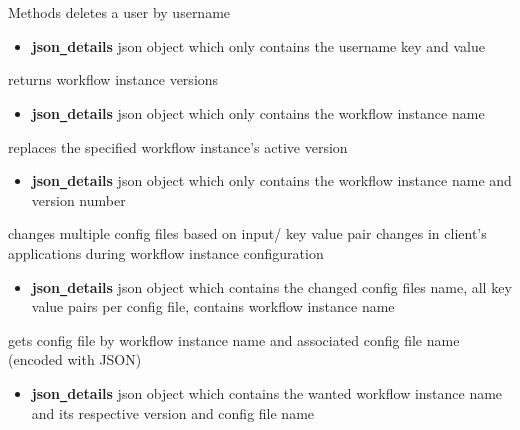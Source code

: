 \begin{methodenv}{Methods}
deletes a user by username
\begin{itemize}
        \item \textbf{json\texttt{\_}details}
        json object which only contains the username key and value
\end{itemize}

returns workflow instance versions
\begin{itemize}
        \item \textbf{json\texttt{\_}details}
        json object which only contains the workflow instance name
\end{itemize}


replaces the specified workflow instance's active version
\begin{itemize}
        \item \textbf{json\texttt{\_}details}
        json object which only contains the workflow instance name and version number
\end{itemize}


changes multiple config files based on input/ key value pair changes in client's applications during workflow instance 
configuration
\begin{itemize}
        \item \textbf{json\texttt{\_}details}
        json object which contains the changed config files name, 
        all key value pairs per config file, 
        contains workflow instance name
\end{itemize}


gets config file by workflow instance name and associated config file name (encoded with JSON)
\begin{itemize}
        \item \textbf{json\texttt{\_}details}
        json object which contains the wanted workflow instance name and its respective version and config file name
\end{itemize}



\end{methodenv}
